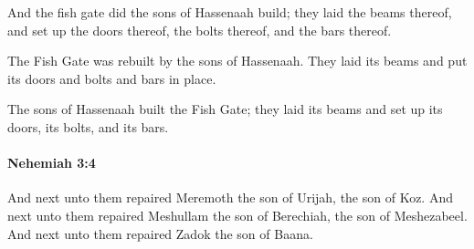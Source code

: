 			\begin{versebox}
					\item[BHS] 
					\item[LXX] 
					\item[ASV] And the fish gate did the sons of Hassenaah build; they laid the beams thereof, and set up the doors thereof, the bolts thereof, and the bars thereof.
					\item[NIV] The Fish Gate was rebuilt by the sons of Hassenaah. They laid its beams and put its doors and bolts and bars in place.
					\item[NRSV] The sons of Hassenaah built the Fish Gate; they laid its beams and set up its doors, its bolts, and its bars.
			\end{versebox}

		\paragraph{Nehemiah 3:4} %
			\label{NEHEMIAH-3-4}

			And next unto them repaired Meremoth the son of Urijah, the son of Koz. And next unto them repaired Meshullam the son of Berechiah, the son of Meshezabeel. And next unto them repaired Zadok the son of Baana.

